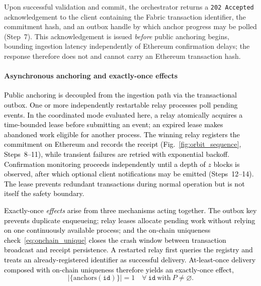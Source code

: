 \documentclass[final,5p,times,twocolumn]{elsarticle}
\begin{document}
Upon successful validation and commit, the orchestrator returns a \texttt{202~Accepted} acknowledgement to the client containing the Fabric transaction identifier, the commitment hash, and an outbox handle by which anchor progress may be polled (Step~7). This acknowledgement is issued \emph{before} public anchoring begins, bounding ingestion latency independently of Ethereum confirmation delays; the response therefore does not and cannot carry an Ethereum transaction hash.

\paragraph*{\textbf{Asynchronous anchoring and exactly-once effects}}
\textcolor{black}{Public anchoring is decoupled from the ingestion path via the transactional outbox. One or more independently restartable relay processes poll pending events. In the coordinated mode evaluated here, a relay atomically acquires a time-bounded lease before submitting an event; an expired lease makes abandoned work eligible for another process. The winning relay registers the commitment on Ethereum and records the receipt (Fig.~\ref{fig:orbit_sequence}, Steps~8--11), while transient failures are retried with exponential backoff. Confirmation monitoring proceeds independently until a depth of $z$ blocks is observed, after which optional client notifications may be emitted (Steps~12--14). The lease prevents redundant transactions during normal operation but is not itself the safety boundary.}

\textcolor{black}{Exactly-once \emph{effects} arise from three mechanisms acting together. The outbox key prevents duplicate enqueueing; relay leases allocate pending work without relying on one continuously available process; and the on-chain uniqueness check~\eqref{eq:onchain_unique} closes the crash window between transaction broadcast and receipt persistence. A restarted relay first queries the registry and treats an already-registered identifier as successful delivery. At-least-once delivery composed with on-chain uniqueness therefore yields an exactly-once effect,}
\begin{equation}
  \big|\{\text{anchors}(\texttt{id})\}\big| = 1
  \quad \forall\ \texttt{id} \ \text{with}\ P\neq\varnothing.
  \label{eq:exactly_once_effect}
\end{equation}
\end{document}
